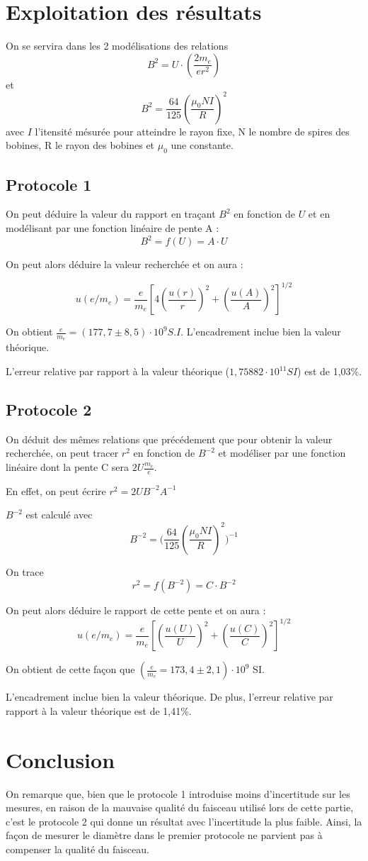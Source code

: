 \documentclass[a4paper,10pt,french]{scrartcl}
\begin{document}
\section{Exploitation des résultats}
On se servira dans les 2 modélisations des relations \[B^2 = U\cdot (\frac{2m_e}{e r^2})\] et \[B^2 = \frac{64}{125}(\frac{\mu_0NI}{R})^2 \] avec \(I\) l'itensité mésurée pour atteindre le rayon fixe, N le nombre de spires des bobines, R le rayon des bobines et \(\mu_0\) une constante.
\subsection{Protocole 1}
On peut déduire la valeur du rapport en traçant \(B^2\) en fonction de \(U\) et en modélisant par une fonction linéaire de pente A : \[B^2 = f(U) = A\cdot U\]

On peut alors déduire la valeur recherchée et on aura :

\[u(e/m_e) = \frac{e}{m_e}[4(\frac{u(r)}{r})^2+(\frac{u(A)}{A})^2]^{1/2}\]

On obtient \(\frac{e}{m_e} = (177,7\pm8,5)\cdot 10^9S.I\). L'encadrement inclue bien la valeur théorique.

L'erreur relative par rapport à la valeur théorique ($1,75882 \cdot 10^{11} SI$) est de 1,03\%.
\subsection{Protocole 2}
On déduit des m\^emes relations que précédement que pour obtenir la valeur recherchée, on peut tracer \(r^2\) en fonction de \(B^{-2}\) et modéliser par une fonction linéaire dont la pente C sera \(2U\frac{m_e}{e}\).

En effet, on peut écrire \(r^2=2UB^{-2}A^{-1}\)

$B^{-2}$ est calculé avec \[B^{-2} = \big(\frac{64}{125}(\frac{\mu_0NI}{R})^2\big)^{-1}\]

On trace \[r^2 = f(B^{-2}) = C\cdot B^{-2}\]

On peut alors déduire le rapport de cette pente et on aura :
\[u(e/m_e) = \frac{e}{m_e}[(\frac{u(U)}{U})^2+(\frac{u(C)}{C})^2]^{1/2}\]

On obtient de cette façon que \((\frac{e}{m_e} = 173,4 \pm 2,1)\cdot 10^9\) SI.

L'encadrement inclue bien la valeur théorique. De plus, l'erreur relative par rapport à la valeur théorique est de 1,41\%.
\section{Conclusion}
On remarque que, bien que le protocole 1 introduise moins d'incertitude sur les mesures, en raison de la mauvaise qualité du faisceau utilisé lors de cette partie, c'est le protocole 2 qui donne un résultat avec l'incertitude la plus faible. Ainsi, la façon de mesurer le diamètre dans le premier protocole ne parvient pas à compenser la qualité du faisceau.
\end{document}
